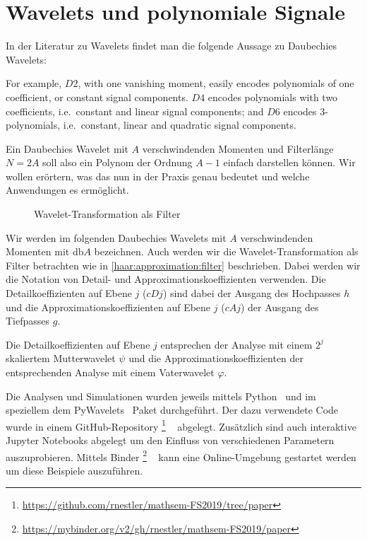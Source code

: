 %
%
%
\chapter{Wavelets und polynomiale Signale\label{chapter:thema}}
\begin{refsection}

In der Literatur zu Wavelets findet man die folgende Aussage zu Daubechies
Wavelets:
\begin{displayquote}
For example, $D2$, with one vanishing moment, easily encodes polynomials of one
coefficient, or constant signal components. $D4$ encodes polynomials with two
coefficients, i.e.\ constant and linear signal components; and $D6$ encodes
3-polynomials, i.e.\ constant, linear and quadratic signal components.
\end{displayquote}
Ein Daubechies Wavelet mit $A$ verschwindenden Momenten und Filterlänge $N=2A$
soll also ein Polynom der Ordnung $A-1$ einfach darstellen können. Wir wollen
erörtern, was das nun in der Praxis genau bedeutet und welche Anwendungen es
ermöglicht.

\begin{figure}
    \centering
    
    \caption{Wavelet-Transformation als Filter\label{polynomials:filter}}
\end{figure}

Wir werden im folgenden Daubechies Wavelets mit $A$ verschwindenden Momenten
mit db$A$ bezeichnen. Auch werden wir die Wavelet-Transformation als Filter
betrachten wie in \autoref{haar:approximation:filter} beschrieben. Dabei werden
wir die Notation von Detail- und Approximationskoeffizienten verwenden. Die
Detailkoeffizienten auf Ebene $j$ ($cDj$) sind dabei der Ausgang des Hochpasses
$h$ und die Approximationskoeffizienten auf Ebene $j$ ($cAj$) der Ausgang des
Tiefpasses $g$.

Die Detailkoeffizienten auf Ebene $j$ entsprechen der Analyse mit einem $2^j$
skaliertem Mutterwavelet $\psi$ und die Approximationskoeffizienten der
entsprechenden Analyse mit einem Vaterwavelet $\varphi$.

Die Analysen und Simulationen wurden jeweils mittels Python~\cite{python} und im
speziellem dem PyWavelets~\cite{gregory_r_lee_2019_2634243} Paket durchgeführt.
Der dazu verwendete Code wurde in einem GitHub-Repository%
\footnote{\url{https://github.com/rnestler/mathsem-FS2019/tree/paper}}%
~\cite{polynomials:repo}
abgelegt. Zusätzlich sind auch interaktive Jupyter Notebooks abgelegt um den
Einfluss von verschiedenen Parametern auszuprobieren. Mittels
Binder%
\footnote{\url{https://mybinder.org/v2/gh/rnestler/mathsem-FS2019/paper}}%
~\cite{project_jupyter-proc-scipy-2018}
kann eine Online-Umgebung gestartet werden um diese Beispiele auszuführen.


\end{refsection}
